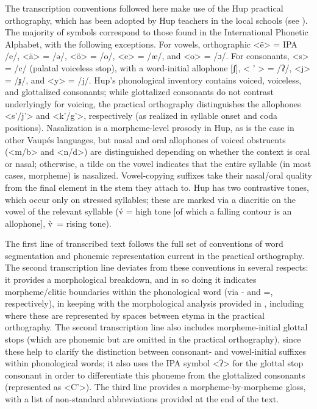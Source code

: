 \documentclass[output=paper,
modfonts,nonflat
]{langsci/langscibook}
\begin{document}
	The transcription conventions followed here make use of the Hup practical orthography, which has been adopted by Hup teachers in the local schools (see
\citealt{Ramirez2006}). The majority of symbols correspond to those found in the International Phonetic Alphabet, with the following exceptions. For vowels, orthographic <ë> = IPA /e/, <ä> = /ǝ/, <ö> = /o/, <e> = /æ/, and <o> = /ɔ/. For consonants, <s> = /c/ (palatal voiceless stop), with a word-initial allophone [ʃ], < ' > = /ʔ/, <j> = /ɟ/, and <y> = /j/. Hup’s phonological inventory contains voiced, voiceless, and glottalized consonants; while glottalized consonants do not contrast underlyingly for voicing, the practical orthography distinguishes the allophones <s’/j’> and <k’/g’>, respectively (as realized in syllable onset and coda positions). Nasalization is a morpheme-level prosody in Hup, as is the case in other Vaupés languages, but nasal and oral allophones of voiced obstruents (<m/b> and <n/d>) are distinguished depending on whether the context is oral or nasal; otherwise, a tilde on the vowel indicates that the entire syllable (in most cases, morpheme) is nasalized. Vowel-copying suffixes take their nasal/oral quality from the final element in the stem they attach to. Hup has two contrastive tones, which occur only on stressed syllables; these are marked via a diacritic on the vowel of the relevant syllable (v́ = high tone [of which a falling contour is an allophone], v̀ = rising tone).

    
	The first line of transcribed text follows the full set of conventions of word segmentation and phonemic representation current in the practical orthography. The second transcription line deviates from these conventions in several respects: it provides a morphological breakdown, and in so doing it indicates morpheme/clitic boundaries within the phonological word (via - and =, respectively), in keeping with the morphological analysis provided in \citet{Epps2008}, including where these are represented by spaces between etyma in the practical orthography. The second transcription line also includes morpheme-initial glottal stops (which are phonemic but are omitted in the practical orthography), since these help to clarify the distinction between consonant- and vowel-initial suffixes within phonological words; it also uses the IPA symbol <ʔ> for the glottal stop consonant in order to differentiate this phoneme from the glottalized consonants (represented as <C’>). The third line provides a morpheme-by-morpheme gloss, with a list of non-standard abbreviations provided at the end of the text.
    
\end{document}
